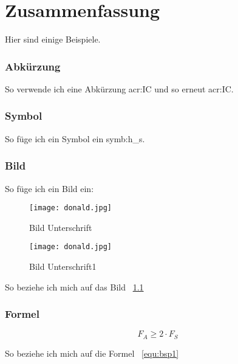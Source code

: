 
\chapter{Zusammenfassung}
\label{sec:conclusion_future-work}


Hier sind einige Beispiele.

\subsection{Abkürzung}
\label{subsec:abkürzung}

So verwende ich eine Abkürzung \gls{acr:IC} und so erneut \gls{acr:IC}.


\subsection{Symbol}
\label{subsec:symbol}
So füge ich ein Symbol ein \gls{symb:h_s}.


\subsection{Bild}
\label{subsec:Bild}
So füge ich ein Bild ein:

\begin{figure}[H]
	\centering
	\texttt{[image: donald.jpg]}
	\caption[Titel für das Abbildungsverzeichnis]{Bild Unterschrift} \cite{wangvlc}
	\label{fig:donald}
\end{figure}


\begin{figure}[H]
	\centering
	\texttt{[image: donald.jpg]}
	\caption[Titel für das Abbildungsverzeichnis1]{Bild Unterschrift1 \cite{stinyAktiveElektronischeBauelemente2019}}
	\label{fig:donald1}
\end{figure}


So beziehe ich mich auf das Bild ~\ref{fig:donald}

\subsection{Formel}
\label{subsec:formel}

\begin{equation}
	\label{equ:bsp1}
	F_{A} \geq 2 \cdot F_{S}
\end{equation}

So beziehe ich mich auf die Formel ~\ref{equ:bsp1}


